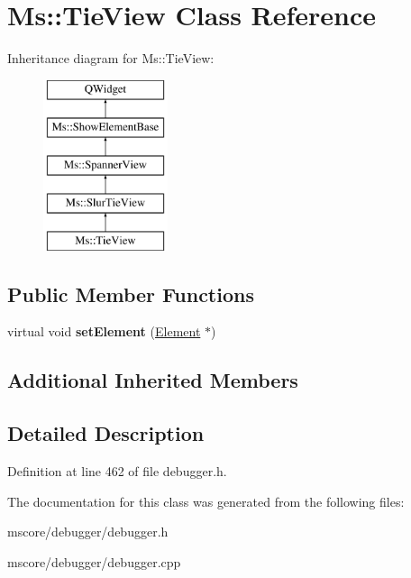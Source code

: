\hypertarget{class_ms_1_1_tie_view}{}\section{Ms\+:\+:Tie\+View Class Reference}
\label{class_ms_1_1_tie_view}
Inheritance diagram for Ms\+:\+:Tie\+View\+:\begin{figure}[H]
\begin{center}
\leavevmode
\includegraphics[height=5.000000cm]{class_ms_1_1_tie_view}
\end{center}
\end{figure}
\subsection*{Public Member Functions}
\begin{DoxyCompactItemize}
\item 
\mbox{\label{class_ms_1_1_tie_view_a943e96905644b13813a01ef7d63c761d}} 
virtual void {\bfseries set\+Element} (\hyperlink{class_ms_1_1_element}{Element} $\ast$)
\end{DoxyCompactItemize}
\subsection*{Additional Inherited Members}


\subsection{Detailed Description}


Definition at line 462 of file debugger.\+h.



The documentation for this class was generated from the following files\+:\begin{DoxyCompactItemize}
\item 
mscore/debugger/debugger.\+h\item 
mscore/debugger/debugger.\+cpp\end{DoxyCompactItemize}
